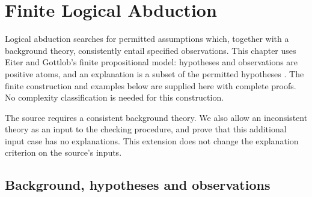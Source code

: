 \chapter{Finite Logical Abduction}
\label{sec:p16-finite-abduction}

Logical abduction searches for permitted assumptions which, together with a
background theory, consistently entail specified observations. This chapter
uses Eiter and Gottlob's finite propositional model: hypotheses and
observations are positive atoms, and an explanation is a subset of the
permitted hypotheses \cite[sec.~2, manuscript pp.~9--11]{EiterGottlobAbductionManuscript}.
The finite construction and examples below are supplied here with complete
proofs. No complexity classification is needed for this construction.

The source requires a consistent background theory. We also allow an
inconsistent theory as an input to the checking procedure, and prove that
this additional input case has no explanations. This extension does not
change the explanation criterion on the source's inputs.

\section{Background, hypotheses and observations}
\label{sec:p16-abduction-inputs}

